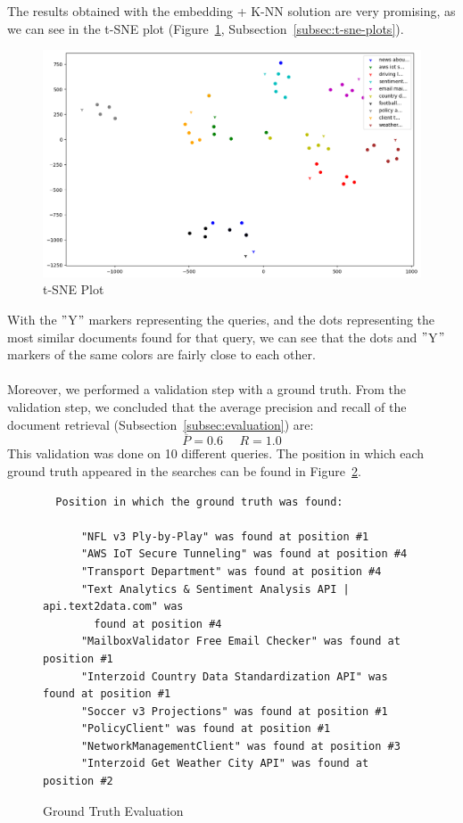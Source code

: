 The results obtained with the embedding + K-NN solution are very promising, as we can see in the t-SNE plot (Figure~\ref{fig:tSNE-plot}, Subsection~\ref{subsec:t-sne-plots}).
\begin{figure}
    \centering
    \includegraphics[width=13cm]{../out/plots/SNE}
    \caption{t-SNE Plot}
    \label{fig:tSNE-plot}
\end{figure}
With the \("\)Y\("\) markers representing the queries, and the dots representing the most similar documents found for that query, we can see that the dots and \("\)Y\("\) markers of the same colors are fairly close to each other. \\ \\
Moreover, we performed a validation step with a ground truth.
From the validation step, we concluded that the average precision and recall of the document retrieval (Subsection~\ref{subsec:evaluation}) are:
\[\overline{P} = 0.6 ~~~~~~ R = 1.0\]
This validation was done on 10 different queries.
The position in which each ground truth appeared in the searches can be found in Figure~\ref{fig:ground-truth-eval}.
\begin{figure}
    \begin{verbatim}
  Position in which the ground truth was found:

      "NFL v3 Ply-by-Play" was found at position #1
      "AWS IoT Secure Tunneling" was found at position #4
      "Transport Department" was found at position #4
      "Text Analytics & Sentiment Analysis API | api.text2data.com" was
        found at position #4
      "MailboxValidator Free Email Checker" was found at position #1
      "Interzoid Country Data Standardization API" was found at position #1
      "Soccer v3 Projections" was found at position #1
      "PolicyClient" was found at position #1
      "NetworkManagementClient" was found at position #3
      "Interzoid Get Weather City API" was found at position #2
    \end{verbatim}
    \caption{Ground Truth Evaluation}
    \label{fig:ground-truth-eval}
\end{figure}
